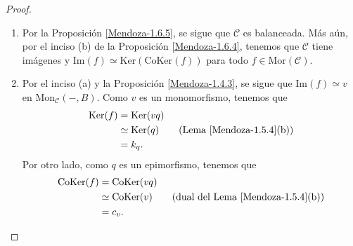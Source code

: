 \documentclass[tesis]{subfiles}
\begin{document}
\begin{proof}\leavevmode

    \begin{enumerate}[label=(\alph*)]
    
        \item Por la Proposición \ref{Mendoza-1.6.5}, se sigue que $\mathscr{C}$ es balanceada. Más aún, por el inciso (b) de la Proposición \ref{Mendoza-1.6.4}, tenemos que $\mathscr{C}$ tiene imágenes y $\text{Im}(f)\simeq\text{Ker}(\text{CoKer}(f))$ para todo $f\in\text{Mor}(\mathscr{C})$.

        \item Por el inciso (a) y la Proposición \ref{Mendoza-1.4.3}, se sigue que $\text{Im}(f)\simeq v$ en $\text{Mon}_\mathscr{C}(-,B)$. Como $v$ es un monomorfismo, tenemos que
            \begin{align*}
                \text{Ker}(f) &= \text{Ker}(vq) \\
                              &\simeq \text{Ker}(q) \tag{Lema \ref{Mendoza-1.5.4}(b)} \\
                              &= k_q.
            \end{align*}
            Por otro lado, como $q$ es un epimorfismo, tenemos que
            \begin{align*}
                \text{CoKer}(f) &= \text{CoKer}(vq) \\
                                &\simeq \text{CoKer}(v) \tag{dual del Lema \ref{Mendoza-1.5.4}(b)} \\
                                &= c_v.
            \end{align*}
    \end{enumerate}
\end{proof}
\end{document}
